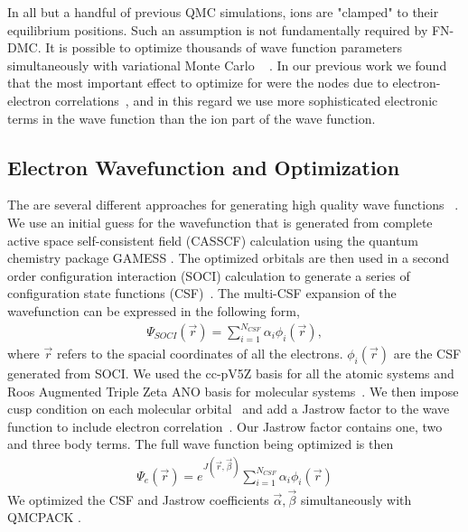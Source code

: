\documentclass[pra,superscriptaddress,groupedaddress,twocolumn]{revtex4}
\begin{document}
In all but a handful of previous QMC simulations,  ions are "clamped" to their equilibrium positions. Such an assumption is not fundamentally required by FN-DMC.  It is possible to optimize thousands of wave function parameters simultaneously with variational Monte Carlo ~\cite{Nightingale_Linear,Umrigar_Linear,Brown_Bench} .   In our previous work we found that the most important effect to optimize for were the nodes due to electron-electron correlations~\cite{Tubman_ECG}, and in this regard we use more sophisticated electronic terms in the wave function than the ion part of the wave function.

\subsection{Electron Wavefunction and Optimization}
The are several different approaches for generating high quality wave functions ~\cite{Umrigar_Alleviation,Toulouse_Bench, Brown_Bench,Seth_Bench}. We use an initial guess for the wavefunction that is generated from complete active space self-consistent field (CASSCF) \cite{Chaban_MCSCF,Szabo} calculation using the quantum chemistry package GAMESS \cite{GAMESS}. The optimized orbitals are then used in a second order configuration interaction (SOCI) calculation to generate a series of configuration state functions (CSF)~\cite{Clark_Bench}. The multi-CSF expansion of the wavefunction  can be expressed in the following form,
\begin{align}
\Psi_{SOCI}(\vec{r})=\sum\limits_{i=1}^{N_{CSF}}\alpha_i\phi_i(\vec{r}), \label{eq:psi_gms}
\end{align}
where $\vec{r}$ refers to the spacial coordinates of all the electrons. $\phi_i(\vec{r})$ are the CSF generated from SOCI. We used the cc-pV5Z basis for all the atomic systems and Roos Augmented Triple Zeta ANO basis for molecular systems~\cite{dunning,roos}. We then impose cusp condition on each molecular orbital~\cite{cusp} and add a Jastrow factor to the wave function to include electron correlation~\cite{Kato}. Our Jastrow factor contains one, two and three body terms. The full wave function being optimized is then
\begin{align}
\Psi_e(\vec{r})=e^{J(\vec{r},\vec{\beta})}\sum\limits_{i=1}^{N_{CSF}}\alpha_i\phi_i(\vec{r})\label{eq:psie}
\end{align}
We optimized the CSF and Jastrow coefficients $\vec{\alpha},\vec{\beta}$ simultaneously with QMCPACK \cite{QMCPACK}.
\end{document}
